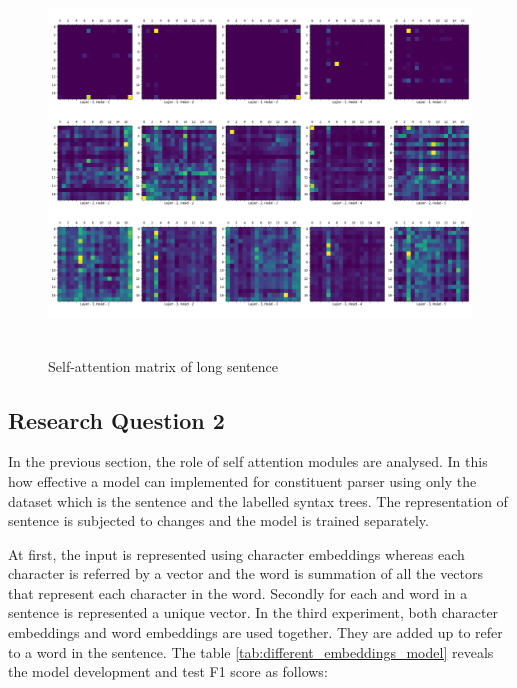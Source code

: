 \documentclass[a4paper, 11pt]{article}
\begin{document}
\begin{figure}[H]
    \centering
    \includegraphics[width=\textwidth,height=10cm,keepaspectratio=true]
    {self-attention-matrix-2.png}
    \caption{
        Self-attention matrix of long sentence
    }
    \label{fig:self-attention-matrix-large-sentence}
\end{figure}


\subsection{Research Question 2}

In the previous section, the role of self attention modules are analysed. In this how effective a model can implemented for constituent parser using only the dataset which is the sentence and the labelled syntax trees. The representation of sentence is subjected to changes and the model is trained separately. 

At first, the input is represented using character embeddings whereas each character is referred by a vector and the word is summation of all the vectors that represent each character in the word. Secondly for each and word in a sentence is represented a unique vector. In the third experiment, both character embeddings and word embeddings are used together. They are added up to refer to a word in the sentence. The table \ref{tab:different_embeddings_model} reveals the model development and test F1 score as follows:
\end{document}
